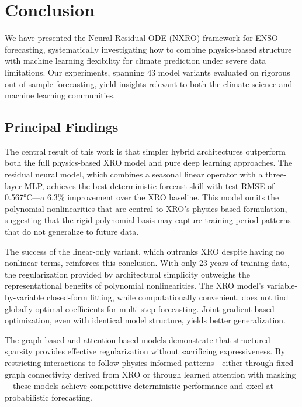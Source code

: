 \section{Conclusion}
\label{sec:conclusion}

We have presented the Neural Residual ODE (NXRO) framework for ENSO forecasting, systematically investigating how to combine physics-based structure with machine learning flexibility for climate prediction under severe data limitations. Our experiments, spanning 43 model variants evaluated on rigorous out-of-sample forecasting, yield insights relevant to both the climate science and machine learning communities.

\subsection{Principal Findings}

The central result of this work is that simpler hybrid architectures outperform both the full physics-based XRO model and pure deep learning approaches. The residual neural model, which combines a seasonal linear operator with a three-layer MLP, achieves the best deterministic forecast skill with test RMSE of 0.567°C---a 6.3\% improvement over the XRO baseline. This model omits the polynomial nonlinearities that are central to XRO's physics-based formulation, suggesting that the rigid polynomial basis may capture training-period patterns that do not generalize to future data.

The success of the linear-only variant, which outranks XRO despite having no nonlinear terms, reinforces this conclusion. With only 23 years of training data, the regularization provided by architectural simplicity outweighs the representational benefits of polynomial nonlinearities. The XRO model's variable-by-variable closed-form fitting, while computationally convenient, does not find globally optimal coefficients for multi-step forecasting. Joint gradient-based optimization, even with identical model structure, yields better generalization.

The graph-based and attention-based models demonstrate that structured sparsity provides effective regularization without sacrificing expressiveness. By restricting interactions to follow physics-informed patterns---either through fixed graph connectivity derived from XRO or through learned attention with masking---these models achieve competitive deterministic performance and excel at probabilistic forecasting.

